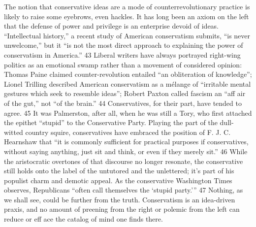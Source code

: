 The notion that conservative ideas are a mode of counterrevolutionary practice is likely to raise some eyebrows, even hackles. It has long been an axiom on the left that the defense of power and privilege is an enterprise devoid of ideas. “Intellectual history,” a recent study of American conservatism submits, “is never unwelcome,” but it “is not the most direct approach to explaining the power of conservatism in America.” {\color{blue}43} Liberal writers have always portrayed right-wing politics as an emotional swamp rather than a movement of considered opinion: Thomas Paine claimed counter-revolution entailed “an obliteration of knowledge”; Lionel Trilling described American conservatism as a mélange of “irritable mental gestures which seek to resemble ideas”; Robert Paxton called fascism an “aff air of the gut,” not “of the brain.” {\color{blue}44} Conservatives, for their part, have tended to agree. {\color{blue}45} It was Palmerston, after all, when he was still a Tory, who first attached the epithet “stupid” to the Conservative Party. Playing the part of the dull-witted country squire, conservatives have embraced the position of F. J. C. Hearnshaw that “it is commonly sufficient for practical purposes if conservatives, without saying anything, just sit and think, or even if they merely sit.” {\color{blue}46} While the aristocratic overtones of that discourse no longer resonate, the conservative still holds onto the label of the untutored and the unlettered; it’s part of his populist charm and demotic appeal. As the conservative Washington Times observes, Republicans “often call themselves the ‘stupid party.’” {\color{blue}47} Nothing, as we shall see, could be further from the truth. Conservatism is an idea-driven praxis, and no amount of preening from the right or polemic from the left can reduce or eff ace the catalog of mind one finds there.
 \par 

